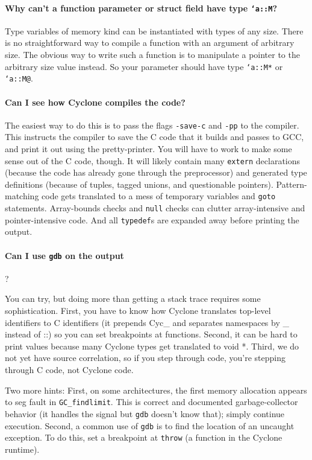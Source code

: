 \paragraph{Why can't a function parameter or struct field have type
  \texttt{`a::M}?} 

Type variables of memory kind can be instantiated with types of any
size.  There is no straightforward way to compile a function with an
argument of arbitrary size.  The obvious way to write such a function
is to manipulate a pointer to the arbitrary size value instead.  So
your parameter should have type \texttt{`a::M*} or \texttt{`a::M@}.

\paragraph{Can I see how Cyclone compiles the code?}

The easiest way to do this is to pass the flags \texttt{-save-c} and
\texttt{-pp} to the compiler.  This instructs the compiler to save the
C code that it builds and passes to GCC, and print it out using the
pretty-printer.  You will have to work to make some sense out of the C
code, though.  It will likely contain many \texttt{extern}
declarations (because the code has already gone through the
preprocessor) and generated type definitions (because of tuples,
tagged unions, and questionable pointers).  Pattern-matching code gets
translated to a mess of temporary variables and \texttt{goto}
statements.  Array-bounds checks and \texttt{null} checks can clutter
array-intensive and pointer-intensive code.  And all \texttt{typedef}s
are expanded away before printing the output.

\paragraph{Can I use \texttt{gdb} on the output}?

You can try, but doing more than getting a stack trace requires some
sophistication.  First, you have to know how Cyclone translates
top-level identifiers to C identifiers (it prepends Cyc_ and separates
namespaces by _ instead of ::) so you can set breakpoints at
functions.  Second, it can be hard to print values because many
Cyclone types get translated to void *.  Third, we do not yet have
source correlation, so if you step through code, you're stepping
through C code, not Cyclone code.

Two more hints: First, on some architectures, the first memory
allocation appears to seg fault in \texttt{GC_findlimit}.  This is
correct and documented garbage-collector behavior (it handles the
signal but \texttt{gdb} doesn't know that); simply continue execution.
Second, a common use of \texttt{gdb} is to find the location of an
uncaught exception.  To do this, set a breakpoint at \texttt{throw} (a
function in the Cyclone runtime).

